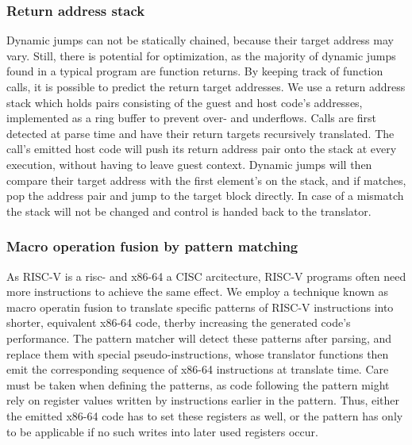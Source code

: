 \subsubsection{Return address stack}
\label{sec:return_address_stack}
Dynamic jumps can not be statically chained, because their target address may vary. Still, there is potential for optimization, as the majority of dynamic jumps found in a typical program are function returns. By keeping track of function calls, it is possible to predict the return target addresses. We use a return address stack which holds pairs consisting of the guest and host code's addresses, implemented as a ring buffer to prevent over- and underflows. Calls are first detected at parse time and have their return targets recursively translated. The call's emitted host code will push its return address pair onto the stack at every execution, without having to leave guest context. Dynamic jumps will then compare their target address with the first element's on the stack, and if matches, pop the address pair and jump to the target block directly. In case of a mismatch the stack will not be changed and control is handed back to the translator. 


\subsubsection{Macro operation fusion by pattern matching}
As RISC-V is a risc- and x86-64 a CISC arcitecture, RISC-V programs often need more instructions to achieve the same effect. We employ a technique known as macro operatin fusion to translate specific patterns of RISC-V instructions into shorter, equivalent x86-64 code, therby increasing the generated code's performance. The pattern matcher will detect these patterns after parsing, and replace them with special pseudo-instructions, whose translator functions then emit the corresponding sequence of x86-64 instructions at translate time. Care must be taken when defining the patterns, as code following the pattern might rely on register values written by instructions earlier in the pattern. Thus, either the emitted x86-64 code has to set these registers as well, or the pattern has only to be applicable if no such writes into later used registers occur.



















